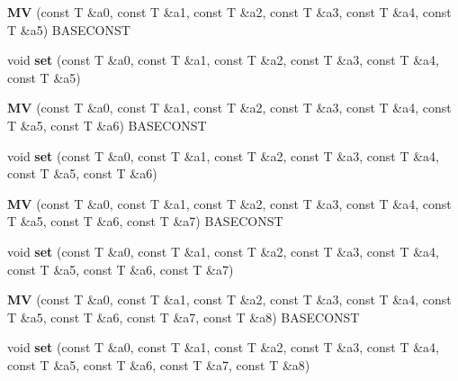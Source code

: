 \begin{DoxyCompactItemize}
\item 
\hypertarget{classvsr_1_1_m_v_a18bda566c8ba2265a469be50f0a7aea7}{{\bfseries M\-V} (const T \&a0, const T \&a1, const T \&a2, const T \&a3, const T \&a4, const T \&a5) B\-A\-S\-E\-C\-O\-N\-S\-T}\label{classvsr_1_1_m_v_a18bda566c8ba2265a469be50f0a7aea7}

\item 
\hypertarget{classvsr_1_1_m_v_a44d1c9b3aa4700bc79e29479f36824ed}{void {\bfseries set} (const T \&a0, const T \&a1, const T \&a2, const T \&a3, const T \&a4, const T \&a5)}\label{classvsr_1_1_m_v_a44d1c9b3aa4700bc79e29479f36824ed}

\item 
\hypertarget{classvsr_1_1_m_v_a983a4868d43ca41f2ca037989dc40a49}{{\bfseries M\-V} (const T \&a0, const T \&a1, const T \&a2, const T \&a3, const T \&a4, const T \&a5, const T \&a6) B\-A\-S\-E\-C\-O\-N\-S\-T}\label{classvsr_1_1_m_v_a983a4868d43ca41f2ca037989dc40a49}

\item 
\hypertarget{classvsr_1_1_m_v_ae32766254c7acb811ea5f3928c2428f6}{void {\bfseries set} (const T \&a0, const T \&a1, const T \&a2, const T \&a3, const T \&a4, const T \&a5, const T \&a6)}\label{classvsr_1_1_m_v_ae32766254c7acb811ea5f3928c2428f6}

\item 
\hypertarget{classvsr_1_1_m_v_abdd37d279a7e022f6d1b830b8c54a562}{{\bfseries M\-V} (const T \&a0, const T \&a1, const T \&a2, const T \&a3, const T \&a4, const T \&a5, const T \&a6, const T \&a7) B\-A\-S\-E\-C\-O\-N\-S\-T}\label{classvsr_1_1_m_v_abdd37d279a7e022f6d1b830b8c54a562}

\item 
\hypertarget{classvsr_1_1_m_v_ab524f4323c389f6e9084168cc863ca2f}{void {\bfseries set} (const T \&a0, const T \&a1, const T \&a2, const T \&a3, const T \&a4, const T \&a5, const T \&a6, const T \&a7)}\label{classvsr_1_1_m_v_ab524f4323c389f6e9084168cc863ca2f}

\item 
\hypertarget{classvsr_1_1_m_v_af815272043b228cfb0efcb331eea633a}{{\bfseries M\-V} (const T \&a0, const T \&a1, const T \&a2, const T \&a3, const T \&a4, const T \&a5, const T \&a6, const T \&a7, const T \&a8) B\-A\-S\-E\-C\-O\-N\-S\-T}\label{classvsr_1_1_m_v_af815272043b228cfb0efcb331eea633a}

\item 
\hypertarget{classvsr_1_1_m_v_a540fa51138ea410d8830f61a7cbf0c42}{void {\bfseries set} (const T \&a0, const T \&a1, const T \&a2, const T \&a3, const T \&a4, const T \&a5, const T \&a6, const T \&a7, const T \&a8)}\label{classvsr_1_1_m_v_a540fa51138ea410d8830f61a7cbf0c42}


\end{DoxyCompactItemize}
